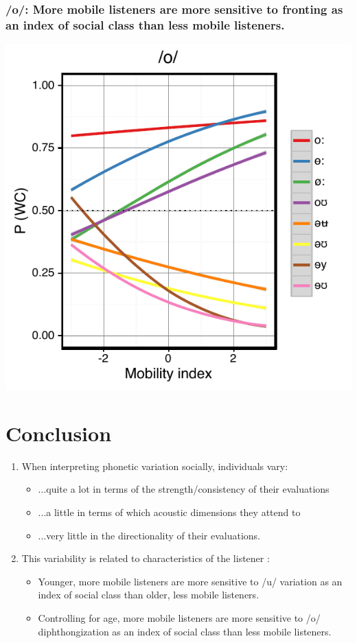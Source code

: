 \documentclass[a0,final]{a0poster}
\begin{document}
\begin{multicols}{4}
\subsubsection*{/o/: More mobile listeners are more sensitive to fronting as an index of social class than less mobile listeners.}
\centering
\includegraphics[scale=1.25]{o_perception_mobility.pdf}
\justify
\vspace*{-1.5cm}
\section*{Conclusion}
\begin{enumerate}
\item{When interpreting phonetic variation socially, individuals vary:\vspace*{0.5cm}\begin{itemize}\item{...quite a lot in terms of the strength/consistency of their evaluations}\item{...a little in terms of which acoustic dimensions they attend to}\item{...very little in the directionality of their evaluations.}\end{itemize}}
\vspace*{0.5cm}
\item{This variability is related to characteristics of the listener :\vspace*{0.5cm}\begin{itemize}\item{Younger, more mobile listeners are more sensitive to /u/ variation as an index of social class than older, less mobile listeners.}\item{Controlling for age, more mobile listeners are more sensitive to /o/ diphthongization as an index of social class than less mobile listeners.}\end{itemize}}
\end{enumerate}


\end{multicols}
\end{document}
